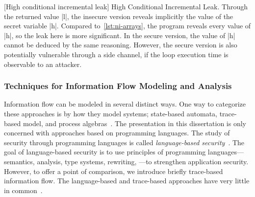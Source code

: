 \begin{center}
\captionsetup{type=lstlisting}
\begin{minipage}{.45\textwidth}
\begin{center}\end{center}
\end{minipage}\hfill
\begin{minipage}{.45\textwidth}
\begin{center}\end{center}
\end{minipage}
[High conditional incremental leak]{
High Conditional Incremental Leak.
Through the returned value \pr|l|, the insecure version reveals implicitly the value of the secret variable \pr|h|.
Compared to~\autoref{lst:ni-arrays}, the program reveals every value of \pr|h|, so the leak here is more significant.
In the secure version, the value of \pr|h| cannot be deduced by the same reasoning.
However, the secure version is also potentially vulnerable through a side channel,
if the loop execution time is observable to an attacker.}
\label{lst:hi-cond}
\end{center}

\subsubsection{Techniques for Information Flow Modeling and Analysis}
\label{if-techniques}

Information flow can be modeled in several distinct ways.
One way to categorize these approaches is by how they model systems;
\eg state-based automata, trace-based model, and process algebras~\cite{vandermeyden2007}.
The presentation in this dissertation is only concerned with approaches based on programming languages.
The study of security through programming languages is called 
{\emph{language-based security}}~\cite{schneider2001,sabelfeld2003}.
The goal of {language-based security} is to use principles of programming languages---semantics, analysis, type systems, rewriting, \etc---to strengthen application security.
However, to offer a point of comparison, we introduce briefly trace-based information flow.
The language-based and trace-based approaches have very little in common~\cite[p. 235]{eggert2014}.

